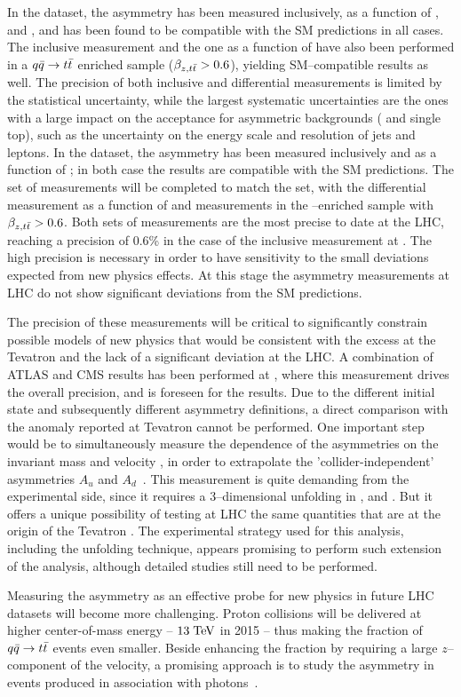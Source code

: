 In the \seventev{} dataset, the asymmetry \ac{} has been measured
inclusively, as a function of \mtt{}, \pttt{} and \ytt{}, and has been found
to be compatible with the SM predictions in all cases. The inclusive
measurement and the one as a function of \mtt{} have also been performed in
a $q\bar{q}{}\to t\bar{t}{}$ enriched sample ($\beta_{z,t\bar{t}}{}>0.6$), yielding
SM--compatible results as well. The precision of both inclusive and
differential measurements is limited by the statistical uncertainty,
while the largest systematic uncertainties are the ones with a large
impact on the acceptance for asymmetric backgrounds (\wjets{} and
single top), such as the uncertainty on the energy scale and
resolution of jets and leptons.
In the \eighttev{} dataset, the asymmetry \ac{} has been measured
inclusively and as a function of \mtt{}; in both case the results are
compatible with the SM predictions. The set of measurements will be
completed to match the \seventev{} set, with the differential
measurement as a function of \pttt{} and measurements in the
\qqbar{}--enriched sample with $\beta_{z,t\bar{t}}{}>0.6$.
Both sets of measurements are the most precise to date at the LHC,
reaching a precision of 0.6\% in the case of the inclusive measurement
at \eighttev{}. The high precision is necessary in order to have
sensitivity to the small deviations expected from new physics effects.
At this stage the asymmetry measurements at LHC do not show
significant deviations from the SM predictions.

The precision of these measurements will be critical to significantly
constrain possible models of new physics that would be consistent with
the excess at the Tevatron and the lack of a significant deviation at
the LHC. A combination of ATLAS and CMS results has been performed at
\seventev{}, where this measurement drives the overall precision, and
is foreseen for the \eighttev{} results.
Due to the different initial state and subsequently different
asymmetry definitions, a direct comparison with the anomaly reported
at Tevatron cannot be performed. One important step would be to
simultaneously measure the dependence of the asymmetries on the
\ttbar{} invariant mass \mtt{} and velocity \betatt{}, in order to
extrapolate the 'collider-independent' asymmetries $A_u$ and
$A_d$~\cite{AguilarSaavedra:2012va}. This measurement is quite
demanding from the experimental side, since it requires a
3--dimensional unfolding in \mtt{}, \betatt{} and \dy{}. But it offers
a unique possibility of testing at LHC the same quantities that are at
the origin of the Tevatron \afb{}.
The experimental strategy used for this analysis, including the
unfolding technique, appears promising to perform such extension of
the analysis, although detailed studies still need to be performed.

Measuring the asymmetry \ac{} as an effective probe for new physics in
future LHC datasets will become more challenging. Proton collisions
will be delivered at higher center-of-mass energy -- $13\; \mathrm{TeV}{}$ in
2015 -- thus making the fraction of $q\bar{q}{}\to t\bar{t}{}$ events even
smaller. Beside enhancing the \qqbar{} fraction by requiring a large
$z$--component of the \ttbar{} velocity, a promising approach is to
study the asymmetry in \ttbar{} events produced in association with
photons~\cite{Aguilar-Saavedra:2014vta}. 
